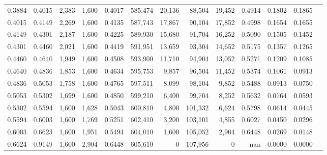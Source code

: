 \begin{tabular}{rrrrrrrrrrrrr}
0.3884 & 0.4015 &  2,383 & 1,600 &                                     0.4017 & 585,474 &  20,136 &  88,504 &  19,452 & 0.4914 & 0.1802 & 0.1865 \\
0.4015 & 0.4149 &  2,269 & 1,600 &                                     0.4135 & 587,743 &  17,867 &  90,104 &  17,852 & 0.4998 & 0.1654 & 0.1655 \\
0.4149 & 0.4301 &  2,187 & 1,600 &                                     0.4225 & 589,930 &  15,680 &  91,704 &  16,252 & 0.5090 & 0.1505 & 0.1452 \\
0.4301 & 0.4460 &  2,021 & 1,600 &                                     0.4419 & 591,951 &  13,659 &  93,304 &  14,652 & 0.5175 & 0.1357 & 0.1265 \\
0.4460 & 0.4640 &  1,949 & 1,600 &                                     0.4508 & 593,900 &  11,710 &  94,904 &  13,052 & 0.5271 & 0.1209 & 0.1085 \\
0.4640 & 0.4836 &  1,853 & 1,600 &                                     0.4634 & 595,753 &   9,857 &  96,504 &  11,452 & 0.5374 & 0.1061 & 0.0913 \\
0.4836 & 0.5053 &  1,758 & 1,600 &                                     0.4765 & 597,511 &   8,099 &  98,104 &   9,852 & 0.5488 & 0.0913 & 0.0750 \\
0.5053 & 0.5302 &  1,699 & 1,600 &                                     0.4850 & 599,210 &   6,400 &  99,704 &   8,252 & 0.5632 & 0.0764 & 0.0593 \\
0.5302 & 0.5594 &  1,600 & 1,628 &                                     0.5043 & 600,810 &   4,800 & 101,332 &   6,624 & 0.5798 & 0.0614 & 0.0445 \\
0.5594 & 0.6003 &  1,600 & 1,769 &                                     0.5251 & 602,410 &   3,200 & 103,101 &   4,855 & 0.6027 & 0.0450 & 0.0296 \\
0.6003 & 0.6623 &  1,600 & 1,951 &                                     0.5494 & 604,010 &   1,600 & 105,052 &   2,904 & 0.6448 & 0.0269 & 0.0148 \\
0.6624 & 0.9149 &  1,600 & 2,904 &                                     0.6448 & 605,610 &       0 & 107,956 &       0 &    nan & 0.0000 & 0.0000 \\
\bottomrule
\end{tabular}
